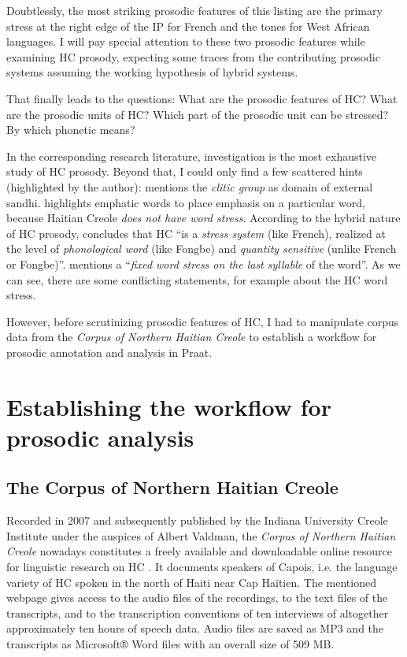 \documentclass[output=paper]{langsci/langscibook}
\begin{document}
Doubtlessly, the most striking prosodic features of this listing are the primary stress at the right edge of the IP for French and the tones for West African languages. I will pay special attention to these two prosodic features while examining HC prosody, expecting some traces from the contributing prosodic systems assuming the working hypothesis of hybrid systems. 

That finally leads to the questions: What are the prosodic features of HC? What are the prosodic units of HC? Which part of the prosodic unit can be stressed? By which phonetic means? 

In the corresponding research literature,  investigation is the most exhaustive study of HC prosody. Beyond that, I could only find a few scattered hints (highlighted by the author):  \citet[140-149]{Dejean1980} mentions the \textit{clitic group} as domain of external sandhi.  \citet[5]{Valdman1988} highlights emphatic words to place emphasis on a particular word, because Haitian Creole \textit{does not have word stress}. According to the hybrid nature of HC prosody, \citet[123]{Brousseau2003} concludes that HC “is a \textit{stress system} (like French), realized at the level of \textit{phonological word} (like Fongbe) and \textit{quantity sensitive} (unlike French or Fongbe)”.  \citet[196]{Fattier2013} mentions a “\textit{fixed word stress on the last syllable} of the word”.  As we can see, there are some conflicting statements, for example about the HC word stress. 

However, before scrutinizing prosodic features of HC, I had to manipulate corpus data from the \textit{Corpus of Northern Haitian Creole} to establish a workflow for prosodic annotation and analysis in Praat.


\section{\label{sec:kal:3}Establishing the workflow for prosodic analysis}
\subsection{The Corpus of Northern Haitian Creole}
 
Recorded in 2007 and subsequently published by the Indiana University Creole Institute under the auspices of Albert Valdman, the \textit{Corpus of Northern Haitian Creole} nowadays constitutes a freely available and downloadable online resource for linguistic research on HC \citep{Valdman.corpus}. It documents speakers of Capois, i.e. the language variety of HC spoken in the north of Haiti near Cap Haïtien. The mentioned webpage gives access to the audio files of the recordings, to the text files of the transcripts, and to the transcription conventions of ten interviews of altogether approximately ten hours of speech data. Audio files are saved as MP3 and the transcripts as Microsoft® Word files with an overall size of 509 MB. 
\end{document}
